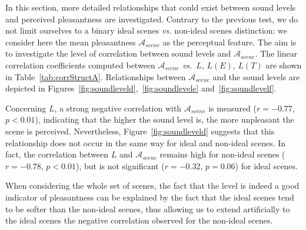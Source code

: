 \documentclass[12pt]{elsarticle}
\newcommand{\vs}{\emph{vs.}}
\begin{document}
In this section, more detailed relationships that could exist between sound levels and perceived pleasantness are investigated. Contrary to the previous test, we do not limit ourselves to a binary ideal scenes \emph{vs.} non-ideal scenes distinction: we consider here the mean pleasantness $\mathcal{A}_{scene}$ as the perceptual feature. The aim is to investigate the level of correlation between sound levels and $\mathcal{A}_{scene}$. The linear correlation coefficients computed between $\mathcal{A}_{scene}$ \vs~$L$, $L(E)$, $L(T)$ are shown in Table~\ref{tab:corrStructA}. Relationships between $\mathcal{A}_{scene}$ and the sound levels are depicted in Figures~\ref{fig:soundleveld},~\ref{fig:soundlevele} and~\ref{fig:soundlevelf}.


Concerning $L$, a strong negative correlation with $\mathcal{A}_{scene}$ is measured ($r=-0.77$, $p<0.01$), indicating that the higher the sound level is, the more unpleasant the scene is perceived. Nevertheless, Figure~\ref{fig:soundleveld} suggests that this relationship does not occur in the same way for ideal and non-ideal scenes. In fact, the correlation between $L$ and $\mathcal{A}_{scene}$ remains high for non-ideal scenes ($r=-0.78$, $p<0.01$), but is not significant ($r=-0.32$, $p=0.06$) for ideal scenes.


When considering the whole set of scenes, the fact that the level is indeed a good indicator of pleasantness can be explained by the fact that the ideal scenes tend to be softer than the non-ideal scenes, thus allowing us to extend artificially to the ideal scenes the negative correlation observed for the non-ideal scenes.

\end{document}
